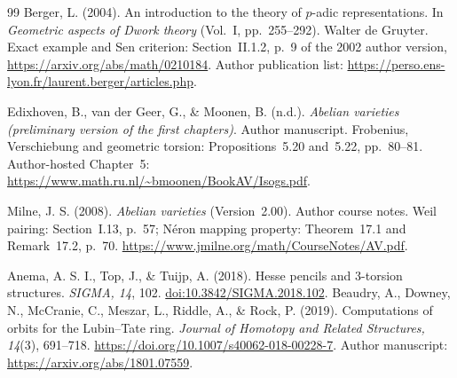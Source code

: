 \begin{thebibliography}{99}
Berger, L. (2004). An introduction to the theory of $p$-adic representations. In \emph{Geometric aspects of Dwork theory} (Vol.~I, pp.~255--292). Walter de Gruyter. Exact example and Sen criterion: Section~II.1.2, p.~9 of the 2002 author version, \url{https://arxiv.org/abs/math/0210184}. Author publication list: \url{https://perso.ens-lyon.fr/laurent.berger/articles.php}.

Edixhoven, B., van der Geer, G., \& Moonen, B. (n.d.). \emph{Abelian varieties (preliminary version of the first chapters)}. Author manuscript. Frobenius, Verschiebung and geometric torsion: Propositions~5.20 and~5.22, pp.~80--81. Author-hosted Chapter~5: \url{https://www.math.ru.nl/~bmoonen/BookAV/Isogs.pdf}.

Milne, J. S. (2008). \emph{Abelian varieties} (Version~2.00). Author course notes. Weil pairing: Section~I.13, p.~57; N\'eron mapping property: Theorem~17.1 and Remark~17.2, p.~70. \url{https://www.jmilne.org/math/CourseNotes/AV.pdf}.

Anema, A. S. I., Top, J., \& Tuijp, A. (2018). Hesse pencils and 3-torsion structures. \emph{SIGMA, 14}, 102. \href{https://doi.org/10.3842/SIGMA.2018.102}{doi:10.3842/SIGMA.2018.102}.
Beaudry, A., Downey, N., McCranie, C., Meszar, L., Riddle, A., \& Rock, P.
(2019).
\newblock Computations of orbits for the Lubin--Tate ring.
\newblock \emph{Journal of Homotopy and Related Structures, 14}(3), 691--718.
\newblock \url{https://doi.org/10.1007/s40062-018-00228-7}.
\newblock Author manuscript: \url{https://arxiv.org/abs/1801.07559}.


\end{thebibliography}

